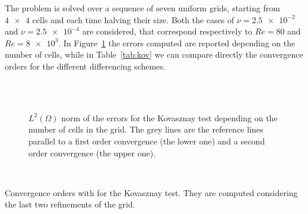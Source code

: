 The problem is solved over a sequence of seven uniform grids, starting from 
$\num{4x4}$ cells and each time halving their size. Both the cases of 
$\nu=\num{2.5e-2}$ and $\nu=\num{2.5e-4}$ are considered, that correspond respectively to 
$Re=80$ and $Re=\num{8e3}$. In Figure~\ref{fig:kov_err} the errors 
computed are reported depending on the number of cells, while in 
Table~\ref{tab:kov} we can compare directly the 
convergence orders for the different differencing schemes.
\begin{figure}
	\centering
	\subfloat[Upwind, $Re = 80$]{
		}
	\subfloat[Upwind, $Re = \num{8e3}$]{
		}\\
	\subfloat[Min-Mod, $Re = 80$]{
		}
	\subfloat[Min-Mod, $Re = \num{8e3}$]{
		}\\
	\subfloat[Van Leer, $Re = 80$]{
		}
	\subfloat[Van Leer, $Re = \num{8e3}$]{
		}
	\caption[$L^2(\Omega)$ norm of the errors for the Kovasznay 
	test]{$L^2(\Omega)$ norm of the errors for the 
	Kovasznay test depending on the number of cells in the grid. The grey lines are the reference lines parallel to a first order convergence (the lower one) and a	second order convergence (the upper one).}
	\label{fig:kov_err}
\end{figure}
\begin{table}
	\centering
	\\
	\caption[Convergence orders for the Kovasznay 
	test]{Convergence orders with for the Kovasznay 
	test. They are computed considering the last two refinements of the 
	grid.}
	\label{tab:kov}
\end{table}

